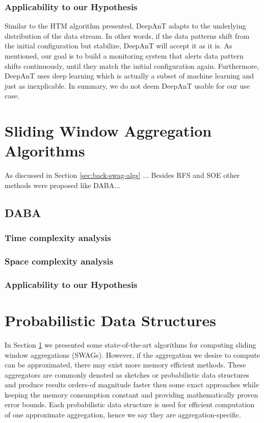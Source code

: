 \subsubsection*{Applicability to our Hypothesis}

Similar to the HTM algorithm presented, DeepAnT adapts to the underlying distribution of the data stream. In other words, if the data patterns shift from the initial configuration but stabilize, DeepAnT will accept it as it is. As mentioned, our goal is to build a monitoring system that alerts data pattern shifts continuously, until they match the initial configuration again. Furthermore, DeepAnT uses deep learning which is actually a subset of machine learning and just as inexplicable. In summary, we do not deem DeepAnT usable for our use case.


\section{Sliding Window Aggregation Algorithms} \label{sec:sota-swag-algs}
As discussed in Section \ref{sec:back-swag-algs} ...
Besides RFS and SOE other methods were proposed like DABA...
\subsection{DABA}
\subsubsection*{Time complexity analysis}
\subsubsection*{Space complexity analysis}
\subsubsection*{Applicability to our Hypothesis}


\section{Probabilistic Data Structures} \label{sec:pds}
In Section \ref{sec:sota-swag-algs} we presented some state-of-the-art algorithms for computing sliding window aggregations (SWAGs). However, if the aggregation we desire to compute can be approximated, there may exist more memory efficient methods. These aggregators are commonly denoted as sketches or probabilistic data structures and produce results orders-of magnitude faster then some exact approaches while keeping the memory consumption constant and providing mathematically proven error bounds. Each probabilistic data structure is used for efficient computation of one approximate aggregation, hence we say they are aggregation-specific.

